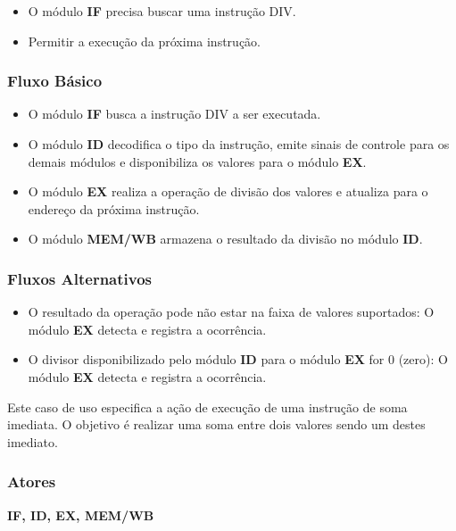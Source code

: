 \preconditions 
\begin{itemize}
 \item O módulo \textbf{IF} precisa buscar uma instrução DIV.
\end{itemize}

\postconditions
\begin{itemize}	
  \item Permitir a execução da próxima instrução.
\end{itemize}

\subsubsection*{Fluxo Básico}
\begin{itemize}
\item O módulo \textbf{IF} busca a instrução DIV a ser executada.
\item O módulo \textbf{ID} decodifica o tipo da instrução, emite sinais de controle para os demais módulos e disponibiliza os valores para o módulo \textbf{EX}.
\item O módulo \textbf{EX} realiza a operação de divisão dos valores e atualiza para o endereço da próxima instrução.
\item O módulo \textbf{MEM/WB} armazena o resultado da divisão no módulo \textbf{ID}.
\end{itemize}

\subsubsection*{Fluxos Alternativos}
\begin{itemize}
\item O resultado da operação pode não estar na faixa de valores suportados:
\subitem O módulo \textbf{EX} detecta e registra a ocorrência.
\item O divisor disponibilizado pelo módulo \textbf{ID} para o módulo \textbf{EX} for 0 (zero):
\subitem O módulo \textbf{EX} detecta e registra a ocorrência.
\end{itemize}


Este caso de uso especifica a ação de execução de uma instrução de soma imediata. O objetivo é realizar uma soma entre dois valores sendo um destes imediato.

\subsubsection*{Atores}
\textbf{IF, ID, EX, MEM/WB}

